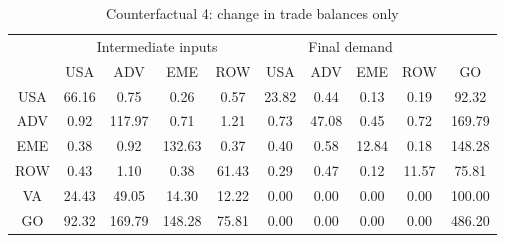 \begin{table}[p]
\begin{center}
\caption{Counterfactual 4: change in trade balances only}
\label{tab:iomat-nx-counter}
\small
\begin{tabular}{cccccccccc}
\toprule
& \multicolumn{4}{c}{Intermediate inputs}& \multicolumn{4}{c}{Final demand} & \\
\cmidrule(rl){2-5}\cmidrule(rl){6-9}
 &USA &ADV &EME &ROW &USA &ADV &EME &ROW& GO\\
\midrule
USA& 66.16& 0.75& 0.26& 0.57& 23.82& 0.44& 0.13& 0.19& 92.32 \\
ADV& 0.92& 117.97& 0.71& 1.21& 0.73& 47.08& 0.45& 0.72& 169.79 \\
EME& 0.38& 0.92& 132.63& 0.37& 0.40& 0.58& 12.84& 0.18& 148.28 \\
ROW& 0.43& 1.10& 0.38& 61.43& 0.29& 0.47& 0.12& 11.57& 75.81 \\
\midrule
VA& 24.43& 49.05& 14.30& 12.22& 0.00& 0.00& 0.00& 0.00& 100.00\\
\midrule
GO& 92.32& 169.79& 148.28& 75.81& 0.00& 0.00& 0.00& 0.00& 486.20\\
\bottomrule
\end{tabular}
\normalsize
\end{center}
\end{table}
